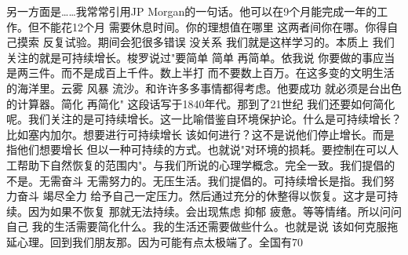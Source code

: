 另一方面是……我常常引用JP Morgan的一句话。他可以在9个月能完成一年的工作。但不能花12个月 需要休息时间。你的理想值在哪里 这两者间你在哪。你得自己摸索 反复试验。期间会犯很多错误 没关系 我们就是这样学习的。本质上 我们关注的就是可持续增长。梭罗说过"要简单 简单 再简单。依我说 你要做的事应当是两三件。而不是成百上千件。数上半打 而不要数上百万。在这多变的文明生活的海洋里。云雾 风暴 流沙。和许许多多事情都得考虑。他要成功 就必须是台出色的计算器。简化 再简化" 这段话写于1840年代。那到了21世纪 我们还要如何简化呢。我们关注的是可持续增长。这一比喻借鉴自环境保护论。什么是可持续增长？ 比如塞内加尔。想要进行可持续增长 该如何进行？这不是说他们停止增长。而是指他们想要增长 但以一种可持续的方式。也就说"对环境的损耗。要控制在可以人工帮助下自然恢复的范围内"。与我们所说的心理学概念。完全一致。我们提倡的不是。无需奋斗 无需努力的。无压生活。我们提倡的。可持续增长是指。我们努力奋斗 竭尽全力 给予自己一定压力。然后通过充分的休整得以恢复。这才是可持续。因为如果不恢复 那就无法持续。会出现焦虑 抑郁 疲惫。等等情绪。所以问问自己 我的生活需要简化什么。我的生活还需要做些什么。也就是说 该如何克服拖延心理。回到我们朋友那。因为可能有点太极端了。全国有70%

